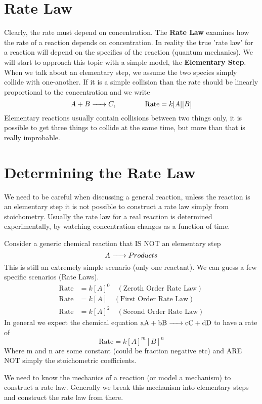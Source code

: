 \documentclass{article}
\newcommand{\be}{\begin{equation}}
\newcommand{\ee}{\end{equation}}
\begin{document}
\section{Rate Law}
Clearly, the rate must depend on concentration.
The \textbf{Rate Law} examines how the rate of a reaction depends on concentration. 
In reality the true 'rate law' for a reaction will depend on the specifics of the reaction (quantum mechanics). 
We will start to approach this topic with a simple model, the \textbf{Elementary Step}.
When we talk about an elementary step, we assume the two species simply collide with one-another. If it is a simple collision than the rate should be  linearly proportional to the concentration and we write
\be
A + B \ce{->} C, \qquad \qquad \text{Rate} = k[A][B]
\ee
Elementary reactions usually contain collisions between two things only, it is possible to get three things to collide at the same time, but more than that is really improbable. 

\section{Determining the Rate Law}
We need to be careful when discussing a general reaction, unless the reaction is an elementary step it is not possible to construct a rate law simply from stoichometry. 
Usually the rate law for a real reaction is determined  experimentally, by watching concentration  changes as a function of time. 

Consider a generic chemical reaction that IS NOT an elementary step
\be
A \ce{->} Products
\ee
This is still an extremely simple scenario (only one reactant). 
We can guess a few specific scenarios (Rate Laws).
\be
\begin{split}
\text{Rate} &= k[A]^0 \quad (\text{Zeroth Order Rate Law})\\
\text{Rate} &= k[A] \quad (\text{First Order Rate Law})\\
\text{Rate} &= k[A]^2 \quad (\text{Second Order Rate Law})
\end{split}
\ee
In general we expect the chemical equation $\ce{aA + bB -> cC + dD}$ to have a rate  of
\be
\text{Rate} = k[A]^m[B]^n
\ee
Where m and n are some constant (could be  fraction negative etc) and ARE NOT simply the stoichometric coefficients.

We need to know the mechanics of a reaction (or model a mechanism) to construct a rate law. 
Generally we break this mechanism into elementary steps and construct the rate law  from there. 
\end{document}
